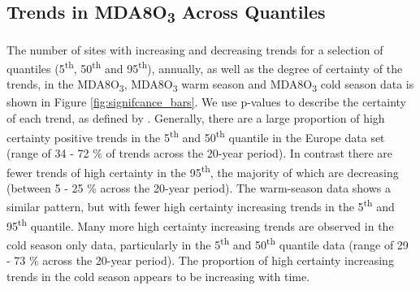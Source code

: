 \documentclass[journal abbreviation, manuscript]{copernicus}
\begin{document}

\subsection{Trends in MDA8O\textsubscript{3} Across Quantiles} \label{sect:new_mda8_trends}

The number of sites with increasing and decreasing trends for a selection of quantiles (5\textsuperscript{th}, 50\textsuperscript{th} and 95\textsuperscript{th}), annually, as well as the degree of certainty of the trends, in the MDA8O\textsubscript{3}, MDA8O\textsubscript{3} warm season and MDA8O\textsubscript{3} cold season data is shown in Figure \ref{fig:signifcance_bars}. We use p-values to describe the certainty of each trend, as defined by \cite{chang2023guidancenotebeststatistical}.
Generally, there are a large proportion of high certainty positive trends in the 5\textsuperscript{th} and 50\textsuperscript{th} quantile in the Europe data set (range of 34 - 72 \% of trends across the 20-year period). In contrast there are fewer trends of high certainty in the 95\textsuperscript{th}, the majority of which are decreasing (between 5 - 25 \% across the 20-year period). The warm-season data shows a similar pattern, but with fewer high certainty increasing trends in the 5\textsuperscript{th} and 95\textsuperscript{th} quantile. Many more high certainty increasing trends are observed in the cold season only data, particularly in the 5\textsuperscript{th} and 50\textsuperscript{th} quantile data (range of 29 - 73 \% across the 20-year period). The proportion of high certainty increasing trends in the cold season appears to be increasing with time.
\end{document}

